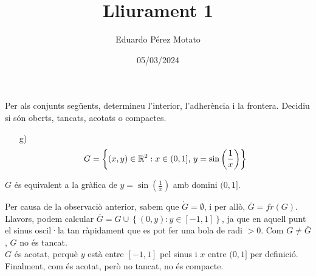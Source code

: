 \documentclass[a4paper, 12pt]{article}
\title{Lliurament 1}
\author{Eduardo Pérez Motato}
\date{05/03/2024}
\begin{document}
    \makeheader
    \setcounter{numex}{3}
    \begin{exercici}
        Per als conjunts següents, determineu l'interior, l'adherència i la frontera. Decidiu si són
        oberts, tancats, acotats o compactes.
        \begin{itemize}
            \item[g)]
            \begin{displaymath}
                G = \left\{\left(x, y\right)  \in \mathbb{R}^2 : x \in (0, 1]\hbox{, }y = \sin\left(\frac{1}{x}\right)\right\} 
            \end{displaymath}
        \end{itemize}
    \end{exercici}
    \begin{solucio}
        \begin{obs}
            $G$ és equivalent a la gràfica de $y = \sin\left(\frac{1}{x}\right)$ amb domini $(0,1]$. 
        \end{obs}
        Per causa de la observaciò anterior, sabem que $\mathring{G} = \emptyset$, i per allò, $\overline{G} = fr\left(G\right)$.
        Llavors, podem calcular $\overline{G} = G \cup \left\{\left(0, y\right): y \in \left[-1, 1\right]\right\}$,
        ja que en aquell punt el sinus oscil·la tan ràpidament que es pot fer una bola de radi $>0$.
        Com $G \neq \overline{G}$, $G$ no és tancat.\\
        $G$ és acotat, perquè $y$ està entre $[-1, 1]$ pel sinus i $x$ entre $(0, 1]$ per definició.
        Finalment, com és acotat, però no tancat, no és compacte.
    \end{solucio}
\end{document}
